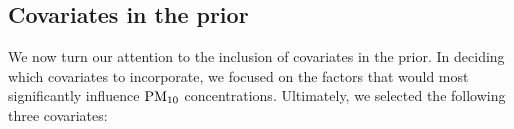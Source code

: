 \documentclass[12pt,	%
	a4paper,		%
	twoside,		%
	openright,		%
	titlepage,%
	]{book}
\theoremstyle{definition}
\begin{document}
\subsection{Covariates in the prior}
\label{Covariates in the clustering}

We now turn our attention to the inclusion of covariates in the prior. In deciding which covariates to incorporate, we focused on the factors that would most significantly influence $\text{PM}_{10}$ concentrations. Ultimately, we selected the following three covariates:
\end{document}
